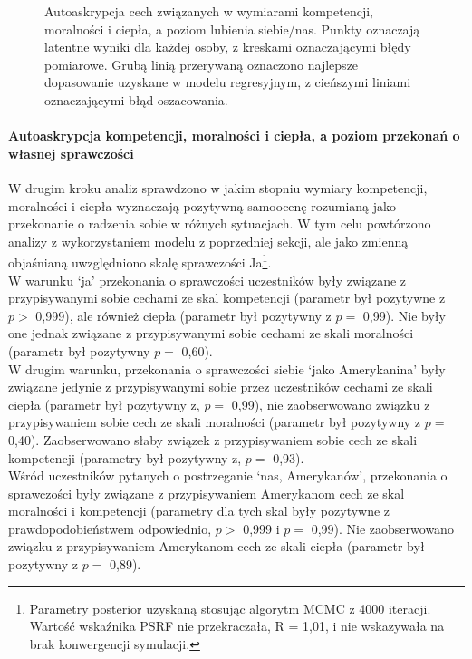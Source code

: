 \documentclass[man]{apa6}
\begin{document}
\begin{figure*}[htbp]
   \centering
   \caption{Autoaskrypcja cech związanych w wymiarami kompetencji, moralności i ciepła, a poziom lubienia siebie/nas. Punkty oznaczają latentne wyniki dla każdej osoby, z kreskami oznaczającymi błędy pomiarowe. Grubą linią przerywaną oznaczono najlepsze dopasowanie uzyskane w modelu regresyjnym, z cieńszymi liniami oznaczającymi błąd oszacowania.}
   \label{fig:study2a}
\end{figure*}


\paragraph{Autoaskrypcja kompetencji, moralności i ciepła, a poziom przekonań o własnej sprawczości}
W drugim kroku analiz sprawdzono w jakim stopniu wymiary kompetencji, moralności i ciepła wyznaczają pozytywną samoocenę rozumianą jako przekonanie o radzenia sobie w różnych sytuacjach. W tym celu powtórzono analizy z wykorzystaniem modelu z poprzedniej sekcji, ale jako zmienną objaśnianą uwzględniono skalę sprawczości Ja\footnote{Parametry posterior uzyskaną stosując algorytm MCMC z 4000 iteracji. Wartość wskaźnika PSRF nie przekraczała, R = 1,01, i nie wskazywała na brak konwergencji symulacji.}. \\

W warunku `ja' przekonania o sprawczości uczestników były związane z przypisywanymi sobie cechami ze skal kompetencji (parametr był pozytywne z $p >$ 0,999), ale również ciepła (parametr był pozytywny z $p =$ 0,99). Nie były one jednak związane z przypisywanymi sobie cechami ze skali moralności (parametr był pozytywny $p =$ 0,60). \\

W drugim warunku, przekonania o sprawczości siebie `jako Amerykanina' były związane jedynie z przypisywanymi sobie przez uczestników cechami ze skali ciepła (parametr był pozytywny z, $p =$ 0,99), nie zaobserwowano związku z przypisywaniem sobie cech ze skali moralności (parametr był pozytywny z $p =$ 0,40). Zaobserwowano słaby związek z przypisywaniem sobie cech ze skali kompetencji (parametry był pozytywny z, $p =$ 0,93).\\

Wśród uczestników pytanych o postrzeganie `nas, Amerykanów', przekonania o sprawczości były związane z przypisywaniem Amerykanom cech ze skal moralności i kompetencji (parametry dla tych skal były pozytywne z prawdopodobieństwem odpowiednio, $p >$ 0,999 i $p =$ 0,99). Nie zaobserwowano związku z przypisywaniem Amerykanom cech ze skali ciepła (parametr był pozytywny z $p =$ 0,89). \\
\end{document}

